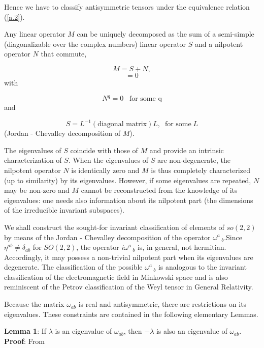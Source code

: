 \documentclass[12pt]{article}
\newcounter{c1} \newcounter{c2}
\newcommand{\bb}{\begin{equation}}
\newcommand{\ee}{\end{equation}}
\begin{document}
Hence we have to classify antisymmetric tensors under the
equivalence relation (\ref{a.2}).
\vspace{1cm}



Any linear operator $M$ can be uniquely decomposed as the sum of
a semi-simple (diagonalizable over the complex numbers) linear
operator $S$ and a nilpotent operator $N$ that commute,

\bb
M=S+N,
\label{a.3}
\ee
\bb
[S,N]=0
\label{a.4}
\ee
%
with

\bb
N^q=0 \;\;\; \mbox{for some q}
\label{a.5}
\ee
%
and

\bb
S= L^{-1} (\mbox{diagonal matrix}) L,\;\; \mbox{for some}\; L
\label{a.6}
\ee
%
(Jordan - Chevalley decomposition of $M$).

The eigenvalues of $S$ coincide with those of $M$ and provide an
intrinsic characterization of $S$. When the eigenvalues of $S$
are non-degenerate, the nilpotent operator $N$ is identically
zero and $M$ is thus completely characterized (up to similarity)
by its eigenvalues.  However, if some eigenvalues are repeated,
$N$ may be non-zero and $M$ cannot be reconstructed from the
knowledge of its eigenvalues: one needs also information about
its nilpotent part (the dimensions of the irreducible invariant
subspaces).

We shall construct the sought-for invariant classification of
elements of $so(2,2)$ by means of the Jordan - Chevalley
decomposition of the operator $\omega^a\,_b$.Since
$\eta^{ab}\neq \delta_{ab}$ for $SO(2,2)$, the operator
$i\omega^a\,_b$ is, in general, not hermitian. Accordingly, it
may possess a non-trivial nilpotent part when its eigenvalues
are degenerate. The classification of the possible $\omega^a\,_b$
is analogous to the invariant classification of the
electromagnetic field in Minkowski space and is also reminiscent
of the Petrov classification of the Weyl tensor in General
Relativity.

Because the matrix $\omega_{ab}$ is real and antisymmetric,
there are restrictions on its eigenvalues. These constraints are
contained in the following elementary Lemmas.


{\bf Lemma 1}: If $\lambda$ is an eigenvalue of $\omega_{ab}$, then
$-\lambda$ is also an eigenvalue of $\omega_{ab}$.\\

{\bf Proof}: From
\end{document}
